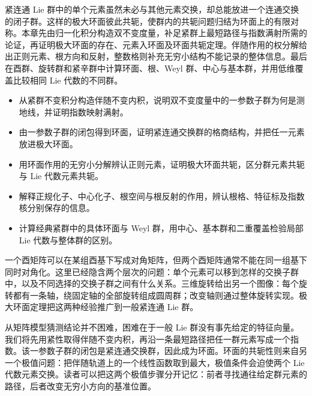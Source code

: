 
% 
% 


\begin{chapterabstract}
	紧连通 Lie 群中的单个元素虽然未必与其他元素交换，却总能放进一个连通交换的闭子群。这样的极大环面彼此共轭，使群内的共轭问题归结为环面上的有限对称。本章先由归一化积分构造双不变度量，补足紧群上最短路径与指数满射所需的论证，再证明极大环面的存在、元素入环面及环面共轭定理。伴随作用的权分解给出正则元素、根方向和反射，整数格则补充无穷小结构不能记录的整体信息。最后在酉群、旋转群和紧辛群中计算环面、根、Weyl 群、中心与基本群，并用低维覆盖比较相同 Lie 代数的不同群。
\end{chapterabstract}

\begin{learninggoals}
	\begin{itemize}
		\item 从紧群不变积分构造伴随不变内积，说明双不变度量中的一参数子群为何是测地线，并证明指数映射满射。
		\item 由一参数子群的闭包得到环面，证明紧连通交换群的格商结构，并把任一元素放进极大环面。
		\item 用环面作用的无穷小分解辨认正则元素，证明极大环面共轭，区分群元素共轭与 Lie 代数元素共轭。
		\item 解释正规化子、中心化子、根空间与根反射的作用，辨认根格、特征标及指数核分别保存的信息。
		\item 计算经典紧群中的具体环面与 Weyl 群，用中心、基本群和二重覆盖检验局部 Lie 代数与整体群的区别。
	\end{itemize}
\end{learninggoals}

一个酉矩阵可以在某组酉基下写成对角矩阵，但两个酉矩阵通常不能在同一组基下同时对角化。这里已经隐含两个层次的问题：单个元素可以移到怎样的交换子群中，以及不同选择的交换子群之间有什么关系。三维旋转给出另一个图像：每个旋转都有一条轴，绕固定轴的全部旋转组成圆周群；改变轴则通过整体旋转实现。极大环面定理把这两种经验推广到一般紧连通 Lie 群。

\ProseParagraphBreak

从矩阵模型猜测结论并不困难，困难在于一般 Lie 群没有事先给定的特征向量。我们将先用紧性取得伴随不变内积，再沿一条最短路径把任一群元素写成一个指数。该一参数子群的闭包是紧连通交换群，因此成为环面。环面的共轭性则来自另一个极值问题：把伴随轨道上的一个线性函数取到最大，极值条件会迫使两个 Lie 代数元素交换。读者可以把这两个极值步骤分开记忆：前者寻找通往给定群元素的路径，后者改变无穷小方向的基准位置。

